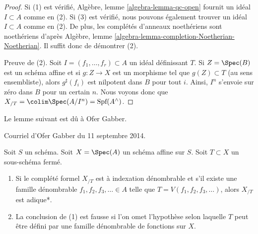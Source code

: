 \begin{proof}
Si (1) est vérifié, Algèbre, lemme \ref{algebra-lemma-qc-open} fournit
un idéal $I \subset A$ comme en (2). Si (3) est vérifié, nous pouvons
également trouver un idéal $I \subset A$ comme en (2). De plus, les complétés
d'anneaux noethériens sont noethériens d'après
Algèbre, lemme \ref{algebra-lemma-completion-Noetherian-Noetherian}.
Il suffit donc de démontrer (2).

\medskip\noindent
Preuve de (2).
Soit $I = (f_1, \ldots, f_r) \subset A$ un idéal définissant $T$.
Si $Z = \Spec(B)$ est un schéma affine et si $g : Z \to X$ est
un morphisme tel que $g(Z) \subset T$ (au sens ensembliste), alors
$g^\sharp(f_i)$ est nilpotent dans $B$ pour tout $i$. Ainsi,
$I^n$ s'envoie sur zéro dans $B$ pour un certain $n$. Nous voyons donc que
$X_{/T} = \colim \Spec(A/I^n) = \text{Spf}(A^\wedge)$.
\end{proof}

\noindent
Le lemme suivant est dû à Ofer Gabber.

\begin{lemma}
\label{lemma-completion-countably-indexed}
\begin{reference}
Courriel d'Ofer Gabber du 11 septembre 2014.
\end{reference}
Soit $S$ un schéma. Soit $X = \Spec(A)$ un schéma affine sur $S$.
Soit $T \subset X$ un sous-schéma fermé.
\begin{enumerate}
\item Si le complété formel $X_{/T}$ est à indexation dénombrable
et s'il existe une famille dénombrable $f_1, f_2, f_3, \ldots \in A$ telle que
$T = V(f_1, f_2, f_3, \ldots)$, alors $X_{/T}$ est adique*.
\item La conclusion de (1) est fausse si l'on omet l'hypothèse selon laquelle
$T$ peut être défini par une famille dénombrable de fonctions sur $X$.
\end{enumerate}
\end{lemma}

